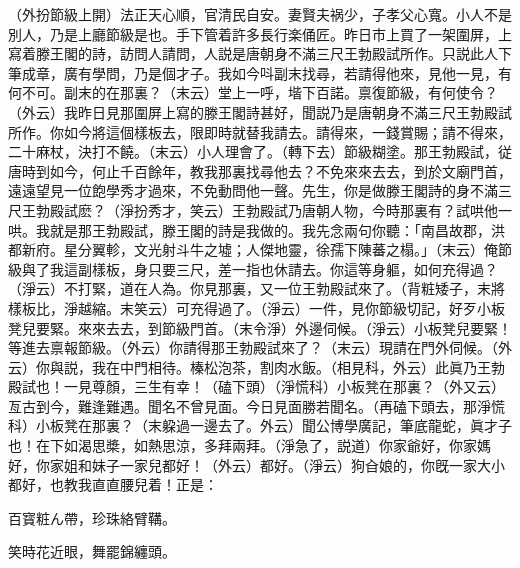 \begin{myquote}
{\marktext\small（外扮節級上開）}法正天心順，官清民自安。妻賢夫祸少，子孝父心寬。小人不是別人，乃是上廳節級是也。手下管着許多長行楽俑匠。昨日市上買了一架圍屏，上寫着滕王閣的詩，訪問人請問，人説是唐朝身不滿三尺王勃殿試所作。只説此人下筆成章，廣有學問，乃是個才子。我如今呌副末找尋，若請得他來，見他一見，有何不可。副末的在那裏？{\marktext\small（末云）}堂上一呼，堦下百諾。禀復節級，有何使令？{\marktext\small（外云）}我昨日見那圍屏上寫的滕王閣詩甚好，聞説乃是唐朝身不滿三尺王勃殿試所作。你如今將這個樣板去，限即時就替我請去。請得來，一錢賞賜；請不得來，二十麻杖，決打不饒。{\marktext\small（末云）}小人理會了。{\marktext\small（轉下去）}節級糊塗。那王勃殿試，従唐時到如今，何止千百餘年，教我那裏找尋他去？不免來來去去，到於文廟門首，遠遠望見一位飽學秀才過來，不免動問他一聲。先生，你是做滕王閣詩的身不滿三尺王勃殿試麽？{\marktext\small（淨扮秀才，笑云）}王勃殿試乃唐朝人物，今時那裏有？試哄他一哄。我就是那王勃殿試，滕王閣的詩是我做的。我先念兩句你聽：「南昌故郡，洪都新府。星分翼軫，文光射斗牛之墟；人傑地靈，徐孺下陳蕃之榻。」{\marktext\small（末云）}俺節級與了我這副樣板，身只要三尺，差一指也休請去。你這等身軀，如何充得過？{\marktext\small（淨云）}不打緊，道在人為。你見那裏，又一位王勃殿試來了。{\marktext\small（背粧矮子，末將樣板比，淨越縮。末笑云）}可充得過了。{\marktext\small（淨云）}一件，見你節級切記，好歹小板凳兒要緊。來來去去，到節級門首。{\marktext\small（末令淨）}外邊伺候。{\marktext\small（淨云）}小板凳兒要緊！等進去禀報節級。{\marktext\small（外云）}你請得那王勃殿試來了？{\marktext\small（末云）}現請在門外伺候。{\marktext\small（外云）}你與説，我在中門相待。榛松泡茶，割肉水飯。{\marktext\small（相見科，外云）}此眞乃王勃殿試也！一見尊顏，三生有幸！{\marktext\small（磕下頭）（淨慌科）}小板凳在那裏？{\marktext\small（外又云）}亙古到今，難逢難遇。聞名不曾見面。今日見面勝若聞名。{\marktext\small（再磕下頭去，那淨慌科）}小板凳在那裏？{\marktext\small（末躱過一邊去了。外云）}聞公博學廣記，筆底龍蛇，眞才子也！在下如渴思槳，如熱思涼，多拜兩拜。{\marktext\small（淨急了，説道）}你家爺好，你家媽好，你家姐和妹子一家兒都好！{\marktext\small（外云）}都好。{\marktext\small（淨云）}狗㒲娘的，你旣一家大小都好，也教我直直腰兒着！正是：

百寳粧ん帶，珍珠絡臂鞲。

笑時花近眼，舞罷錦纏頭。
\end{myquote}

